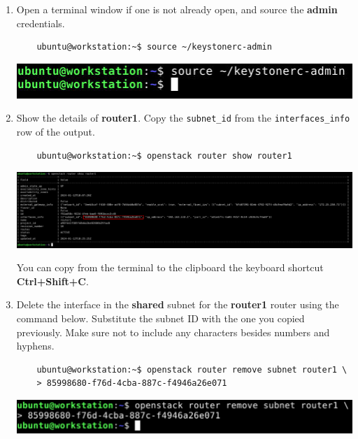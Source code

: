 \documentclass[letterpaper, 12pt]{article}
\begin{document}
\begin{enumerate}
    \item Open a terminal window if one is not already open, and source the \textbf{admin} credentials.
    \begin{lstlisting}
    ubuntu@workstation:~$ source ~/keystonerc-admin
    \end{lstlisting}

    \begin{center}
        \includegraphics[width=\linewidth]{images/part2/step8.png}
    \end{center}

    \item Show the details of \textbf{router1}. Copy the \texttt{subnet\_id} from the
    \texttt{interfaces\_info} row of the output.
    \begin{lstlisting}
    ubuntu@workstation:~$ openstack router show router1
    \end{lstlisting}

    \begin{center}
        \includegraphics[width=\linewidth]{images/part2/step9.png}
    \end{center}

    \begin{tipbox}
        You can copy from the terminal to the clipboard the keyboard shortcut \textbf{Ctrl+Shift+C}.
    \end{tipbox}

    \item Delete the interface in the \textbf{shared} subnet for the \textbf{router1} router using the command below.
    Substitute the subnet ID with the one you copied previously. Make sure not to include any characters besides numbers
    and hyphens.
    \begin{lstlisting}
    ubuntu@workstation:~$ openstack router remove subnet router1 \
    > 85998680-f76d-4cba-887c-f4946a26e071
    \end{lstlisting}

    \begin{center}
        \includegraphics[width=\linewidth]{images/part2/step10.png}
    \end{center}


\end{enumerate}
\end{document}
